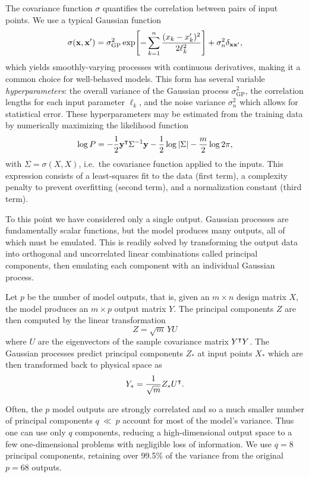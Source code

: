 \documentclass[aps,prc,reprint,amsmath,nofootinbib,noeprint]{revtex4-1}
\begin{document}
The covariance function $\sigma$ quantifies the correlation between pairs of input points.
We use a typical Gaussian function
\begin{equation}
  \sigma(\mathbf x, \mathbf x') = \sigma_\text{GP}^2 \exp\Biggl[ -\sum_{k=1}^n \frac{(x_k - x'_k)^2}{2\ell_k^2} \Biggr] + \sigma_n^2\delta_{\mathbf x\mathbf x'},
\end{equation}
which yields smoothly-varying processes with continuous derivatives, making it a common choice for well-behaved models.
This form has several variable \emph{hyperparameters}:
the overall variance of the Gaussian process $\sigma_\text{GP}^2$,
the correlation lengths for each input parameter $\ell_k$,
and the noise variance $\sigma_n^2$ which allows for statistical error.
These hyperparameters may be estimated from the training data by numerically maximizing the likelihood function
\begin{equation}
  \log P = -\frac{1}{2} \mathbf y^\intercal \Sigma^{-1} \mathbf y - \frac{1}{2} \log |\Sigma| - \frac{m}{2} \log 2\pi,
\end{equation}
with $\Sigma = \sigma(X, X)$, i.e.\ the covariance function applied to the inputs.
This expression consists of a least-squares fit to the data (first term), a complexity penalty to prevent overfitting (second term), and a normalization constant (third term).

To this point we have considered only a single output.
Gaussian processes are fundamentally scalar functions, but the model produces many outputs, all of which must be emulated.
This is readily solved by transforming the output data into orthogonal and uncorrelated linear combinations called principal components, then emulating each component with an individual Gaussian process.

Let $p$ be the number of model outputs, that is, given an $m \times n$ design matrix $X$, the model produces an $m \times p$ output matrix $Y$.
The principal components $Z$ are then computed by the linear transformation
\begin{equation}
  Z = \sqrt m \, Y U
\end{equation}
where $U$ are the eigenvectors of the sample covariance matrix $Y^\intercal Y$.
The Gaussian processes predict principal components $Z_*$ at input points $X_*$ which are then transformed back to physical space as
\begin{equation}
  Y_* = \frac{1}{\sqrt m} Z_* U^\intercal.
\end{equation}

Often, the $p$ model outputs are strongly correlated and so a much smaller number of principal components $q~\ll~p$ account for most of the model's variance.
Thus one can use only $q$ components, reducing a high-dimensional output space to a few one-dimensional problems with negligible loss of information.
We use $q = 8$ principal components, retaining over 99.5\% of the variance from the original $p = 68$ outputs.
\end{document}
